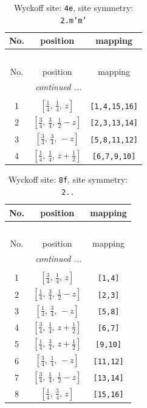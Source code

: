 \documentclass[fleqn,8pt]{jsarticle}
\begin{document}
\renewcommand{\arraystretch}{1.2}
\begin{longtable}{ccc}
\caption{Wyckoff site: {\tt 4e}, site symmetry: {\tt 2.m'm'}}
 \\
 \hline \hline
No. & position & mapping \\ \hline \endfirsthead

\multicolumn{2}{l}{\tablename\ \thetable{}} \\
 \hline \hline
No. & position & mapping \\ \hline \endhead

 \hline \hline
\multicolumn{2}{r}{\footnotesize\it continued ...} \\ \endfoot

 \hline \hline
\multicolumn{2}{r}{} \\ \endlastfoot

1 & $\left[ \frac{1}{4},\, \frac{1}{4},\, z \right]$ & {\tt [1,4,15,16]} \\ \hline
2 & $\left[ \frac{3}{4},\, \frac{3}{4},\, \frac{1}{2} - z \right]$ & {\tt [2,3,13,14]} \\ \hline
3 & $\left[ \frac{3}{4},\, \frac{3}{4},\, - z \right]$ & {\tt [5,8,11,12]} \\ \hline
4 & $\left[ \frac{1}{4},\, \frac{1}{4},\, z + \frac{1}{2} \right]$ & {\tt [6,7,9,10]} \\
\end{longtable}
\renewcommand{\arraystretch}{1.2}
\begin{longtable}{ccc}
\caption{Wyckoff site: {\tt 8f}, site symmetry: {\tt 2..}}
 \\
 \hline \hline
No. & position & mapping \\ \hline \endfirsthead

\multicolumn{2}{l}{\tablename\ \thetable{}} \\
 \hline \hline
No. & position & mapping \\ \hline \endhead

 \hline \hline
\multicolumn{2}{r}{\footnotesize\it continued ...} \\ \endfoot

 \hline \hline
\multicolumn{2}{r}{} \\ \endlastfoot

1 & $\left[ \frac{3}{4},\, \frac{1}{4},\, z \right]$ & {\tt [1,4]} \\ \hline
2 & $\left[ \frac{1}{4},\, \frac{3}{4},\, \frac{1}{2} - z \right]$ & {\tt [2,3]} \\ \hline
3 & $\left[ \frac{1}{4},\, \frac{3}{4},\, - z \right]$ & {\tt [5,8]} \\ \hline
4 & $\left[ \frac{3}{4},\, \frac{1}{4},\, z + \frac{1}{2} \right]$ & {\tt [6,7]} \\ \hline
5 & $\left[ \frac{1}{4},\, \frac{3}{4},\, z + \frac{1}{2} \right]$ & {\tt [9,10]} \\ \hline
6 & $\left[ \frac{3}{4},\, \frac{1}{4},\, - z \right]$ & {\tt [11,12]} \\ \hline
7 & $\left[ \frac{3}{4},\, \frac{1}{4},\, \frac{1}{2} - z \right]$ & {\tt [13,14]} \\ \hline
8 & $\left[ \frac{1}{4},\, \frac{3}{4},\, z \right]$ & {\tt [15,16]} \\
\end{longtable}
\end{document}
